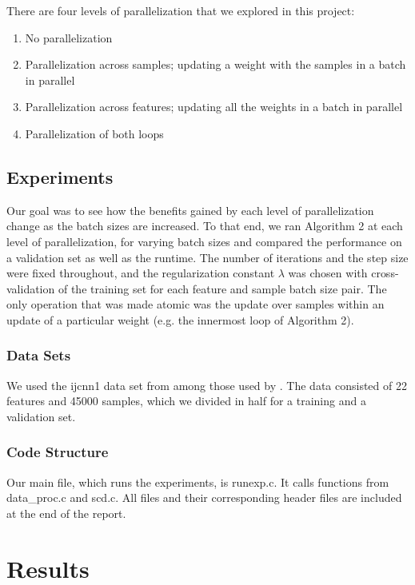\documentclass{article}
\begin{document}
There are four levels of parallelization that we explored in this project:
\begin{enumerate}
\item
No parallelization
\item
Parallelization across samples; updating a weight with the samples in a batch in parallel
\item
Parallelization across features; updating all the weights in a batch in parallel
\item
Parallelization of both loops
\end{enumerate}
\subsection{Experiments}
Our goal was to see how the benefits gained by each level of parallelization change as the batch sizes are increased.  To that end, we ran Algorithm 2 at each level of parallelization, for varying batch sizes and compared the performance on a validation set as well as the runtime. The number of iterations and the step size were fixed throughout, and the regularization constant $\lambda$ was chosen with cross-validation of the training set for each feature and sample batch size pair. The only operation that was made atomic was the update over samples within an update of a particular weight (e.g. the innermost loop of Algorithm 2).
\subsubsection{Data Sets}
We used the ijcnn1 data set from among those used by \cite{shotgun2011}. The data consisted of 22 features and 45000  samples, which we divided in half for a training and a validation set.
\subsubsection{Code Structure}
Our main file, which runs the experiments, is runexp.c.  It calls functions from data_proc.c and scd.c. All files and their corresponding header files are included at the end of the report.

\section{Results}
\end{document}
